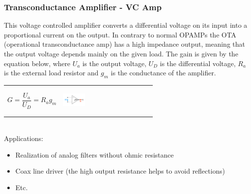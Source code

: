 		\subsubsection{Transconductance Amplifier - VC Amp}
			This voltage controlled amplifier converts a differential voltage on its input into a proportional current on the output. In contrary to normal OPAMPs the OTA (operational transconductance amp) has a high impedance output, meaning that the output voltage depends mainly on the given load. 
			The gain is given by the equation below, where $U_a$ is the output voltage, $U_D$ is the differential voltage, $R_a$ is the external load resistor and $g_m$ is the conductance of the amplifier. 
			\begin{table}[h!]
				\centering
				\begin{tabular}{m{} m{} }
					
					\begin{equation}
						G = \frac{U_a}{U_D} = R_a g_m
					\end{equation}		
				&
							
					\begin{center}\includegraphics[width=0.25\textwidth]{images/OTA.png}\end{center} 
				\\
			
				\end{tabular}
			\end{table}
			\\
			Applications: \\
			\begin{itemize}
				\setlength{\itemsep}{-4pt}
				\item Realization of analog filters without ohmic resistance
				\item Coax line driver (the high output resistance helps to avoid reflections)
				\item Etc.
			\end{itemize}			
			
